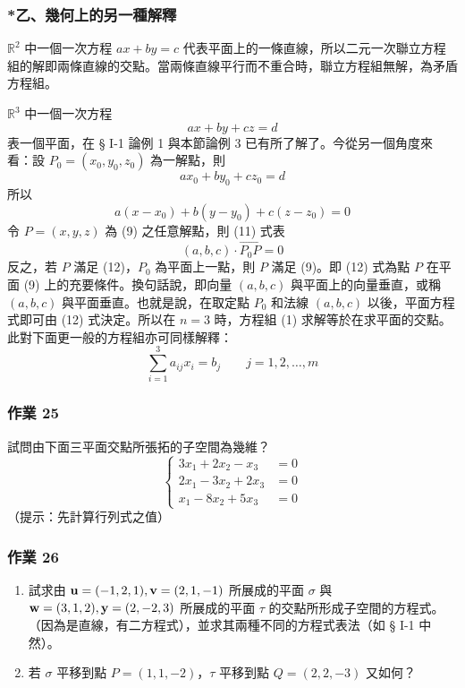 \subsubsection*{*乙、幾何上的另一種解釋}\label{subsec:b6s-1-8-b}

$\mathbb{R}^2$ 中一個一次方程 $ax+by=c$ 代表平面上的一條直線，所以二元一次聯立方程組的解即兩條直線的交點。當兩條直線平行而不重合時，聯立方程組無解，為矛盾方程組。

$\mathbb{R}^3$ 中一個一次方程
\setcounter{equation}{8}
\begin{equation}
ax + by + cz = d \label{eq:b6s-1-8-9}
\end{equation}
表一個平面，在 § I-1 論例 1 與本節論例 3 已有所了解了。今從另一個角度來看：設 $P_0=(x_0, y_0, z_0)$ 為一解點，則
\begin{equation}
ax_0 + by_0 + cz_0 = d \label{eq:b6s-1-8-10}
\end{equation}
所以
\begin{equation}
a(x-x_0) + b(y-y_0) + c(z-z_0) = 0 \label{eq:b6s-1-8-11}
\end{equation}
令 $P=(x, y, z)$ 為 (9) 之任意解點，則 (11) 式表
\begin{equation}
(a, b, c) \cdot \vec{P_0P} = 0 \label{eq:b6s-1-8-12}
\end{equation}
反之，若 $P$ 滿足 (12)，$P_0$ 為平面上一點，則 $P$ 滿足 (9)。即 (12) 式為點 $P$ 在平面 (9) 上的充要條件。換句話說，即向量 $(a, b, c)$ 與平面上的向量垂直，或稱 $(a, b, c)$ 與平面垂直。也就是說，在取定點 $P_0$ 和法線 $(a, b, c)$ 以後，平面方程式即可由 (12) 式決定。所以在 $n=3$ 時，方程組 (1) 求解等於在求平面的交點。此對下面更一般的方程組亦可同樣解釋：
\begin{equation}
\sum_{i=1}^3 a_{ij} x_i = b_j \qquad j=1, 2, \dots, m \label{eq:b6s-1-8-13}
\end{equation}

\subsubsection*{作業 25}\label{hw:b6s-1-25}
試問由下面三平面交點所張拓的子空間為幾維？
\[ \left\{\begin{aligned}
3x_1 + 2x_2 - x_3 &= 0 \\
2x_1 - 3x_2 + 2x_3 &= 0 \\
x_1 - 8x_2 + 5x_3 &= 0
\end{aligned}\right. \]
（提示：先計算行列式之值）

\subsubsection*{作業 26}\label{hw:b6s-1-26}
\begin{enumerate}[label=(\roman*), leftmargin=2em]
  \item 試求由 $\boldsymbol{\mathbf{u}}=(-1, 2, 1), \boldsymbol{\mathbf{v}}=(2, 1, -1)$ 所展成的平面 $\sigma$ 與 $\boldsymbol{\mathbf{w}}=(3, 1, 2), \boldsymbol{\mathbf{y}}=(2, -2, 3)$ 所展成的平面 $\tau$ 的交點所形成子空間的方程式。（因為是直線，有二方程式），並求其兩種不同的方程式表法（如 § I-1 中然）。
  \item 若 $\sigma$ 平移到點 $P=(1, 1, -2)$，$\tau$ 平移到點 $Q=(2, 2, -3)$ 又如何？
\end{enumerate}

